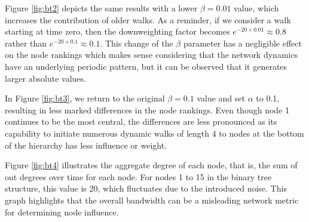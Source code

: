 Figure \ref{fig:bt2} depicts the same results with a lower $\beta=0.01$ value, which increases the contribution of older walks. As a reminder, if we consider a walk starting at time zero, then the  downweighting factor becomes $e^{−20 \times 0.01} \approx 0.8$ rather than $e^{−20 \times 0.1} \approx 0.1$. This change of the $\beta$ parameter has a negligible effect on the node rankings which makes sense considering that the network dynamics have an underlying periodic pattern, but it can be observed that it generates larger absolute values.

In Figure \ref{fig:bt3}, we return to the original $\beta=0.1$ value and set $\alpha$ to 0.1, resulting in less marked differences in the node rankings. Even though node 1 continues to be the most central, the differences are less pronounced as its capability to initiate numerous dynamic walks of length 4 to nodes at the bottom of the hierarchy has less influence or weight.

Figure \ref{fig:bt4} illustrates the aggregate degree of each node, that is, the sum of out degrees over time for each node. For nodes 1 to 15 in the binary tree structure, this value is 20, which fluctuates due to the introduced noise. This graph highlights that the overall bandwidth can be a misleading network metric for determining node influence.

